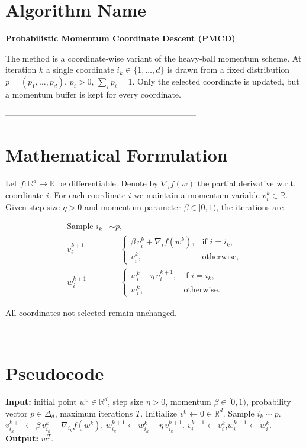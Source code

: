 \documentclass{article}
\newcommand{\R}{\mathbb{R}}
\begin{document}
\section*{Algorithm Name}
\textbf{Probabilistic Momentum Coordinate Descent (PMCD)}  

The method is a coordinate‑wise variant of the heavy‑ball momentum scheme.  
At iteration $k$ a single coordinate $i_k\in\{1,\dots,d\}$ is drawn from a fixed
distribution $p=(p_1,\dots,p_d)$, $p_i>0$, $\sum_i p_i=1$.  
Only the selected coordinate is updated, but a momentum buffer is kept for
every coordinate.

---------------------------------------------------------------------

\section*{Mathematical Formulation}
Let $f:\R^d\rightarrow\R$ be differentiable.  
Denote by $\nabla_i f(w)$ the partial derivative w.r.t. coordinate $i$.
For each coordinate $i$ we maintain a momentum variable $v_i^k\in\R$.
Given step size $\eta>0$ and momentum parameter $\beta\in[0,1)$, the
iterations are

\[
\begin{aligned}
\text{Sample } i_k &\sim p,\\[4pt]
v_i^{k+1} &=
\begin{cases}
\beta\,v_i^{k}+ \nabla_i f(w^{k}), &\text{if } i=i_k,\\[4pt]
v_i^{k}, &\text{otherwise},
\end{cases}\\[6pt]
w_i^{k+1} &=
\begin{cases}
w_i^{k}-\eta\, v_i^{k+1}, &\text{if } i=i_k,\\[4pt]
w_i^{k}, &\text{otherwise}.
\end{cases}
\end{aligned}
\tag{PMCD}
\]

All coordinates not selected remain unchanged.

---------------------------------------------------------------------

\section*{Pseudocode}
\begin{algorithm}[H]
\caption{Probabilistic Momentum Coordinate Descent}
\begin{algorithmic}[1]
\State \textbf{Input:} initial point $w^{0}\in\R^{d}$, step size $\eta>0$, momentum $\beta\in[0,1)$,
probability vector $p\in\Delta_{d}$, maximum iterations $T$.
\State Initialize $v^{0}\gets 0\in\R^{d}$.
    \State Sample $i_k\sim p$.
    \State $v_{i_k}^{k+1}\gets \beta\,v_{i_k}^{k}+ \nabla_{i_k}f(w^{k})$.
    \State $w_{i_k}^{k+1}\gets w_{i_k}^{k}-\eta\,v_{i_k}^{k+1}$.
        \State $v_i^{k+1}\gets v_i^{k}$,\quad $w_i^{k+1}\gets w_i^{k}$.
    \EndFor
\EndFor
\State \textbf{Output:} $w^{T}$.
\end{algorithmic}
\end{algorithm}
\end{document}
